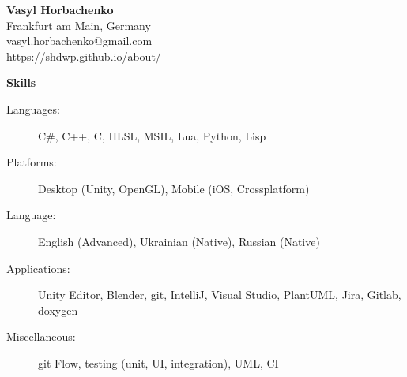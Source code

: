 \documentclass[letterpaper,11pt]{article}
\newcommand{\resheading}[1]{{\vspace{.2in} \large \colorbox{title_bg}{\begin{minipage}{\textwidth}{\textbf{#1 \vphantom{p\^{E}}}}\end{minipage}}}}
\begin{document}
\begin{minipage}{.70\linewidth}
	\begin{center}
		\textbf{\Large Vasyl Horbachenko} \\
		Frankfurt am Main, Germany \\
		vasyl.horbachenko@gmail.com \\
		\href{https://shdwp.github.io/about/}{\textcolor{link_fg}{\underline{https://shdwp.github.io/about/}}} \\

		\vspace{0.2in}
		\resheading{Skills}
		\begin{description}
			\item[Languages:]
				C\#, C++, C, HLSL, MSIL, Lua, Python, Lisp
			\item[Platforms:]
				Desktop (Unity, OpenGL), Mobile (iOS, Crossplatform)
		\end{description}
	\end{center}
\end{minipage}
\hfill
\begin{minipage}{.26\linewidth}
	\begin{flushright}
	\end{flushright}
\end{minipage}
\begin{description}
	\item[Language:]
		English (Advanced), Ukrainian (Native), Russian (Native)
	\item[Applications:]
		Unity Editor, Blender, git, IntelliJ, Visual Studio, PlantUML, Jira, Gitlab, doxygen
	\item[Miscellaneous:]
		git Flow, testing (unit, UI, integration), UML, CI
\end{description}
\end{document}

